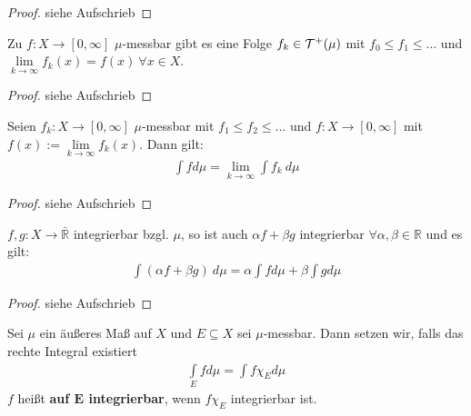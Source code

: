 \documentclass[11pt,a4paper,fleqn,openany]{report}
\begin{document}
    \begin{proof}
      siehe Aufschrieb
    \end{proof}

    \begin{theorem}
      Zu $f: X \to [0,\infty]$ $\mu$-messbar gibt es eine Folge $f_k \in \mathcal{T}^+(\mu)$ mit $f_0 \leq f_1 \leq ...$ und $\lim\limits_{k \to \infty} f_k(x) = f(x) \ \forall x \in X$.
    \end{theorem}

    \begin{proof}
      siehe Aufschrieb
    \end{proof}

    \begin{theorem}
      Seien $f_k:X \to [0,\infty]$ $\mu$-messbar mit $f_1 \leq f_2 \leq ...$ und $f: X \to [0, \infty]$ mit $f(x) := \lim\limits_{k \to \infty} f_k(x)$. Dann gilt:
      \begin{align*}
        \int f d\mu = \lim\limits_{k \to \infty} \int f_k \ d\mu
      \end{align*}
    \end{theorem}

    \begin{proof}
      siehe Aufschrieb
    \end{proof}

    \begin{theorem}
      $f,g: X \to \bar{\mathbb{R}}$ integrierbar bzgl. $\mu$, so ist auch $\alpha f + \beta g$ integrierbar $\forall \alpha, \beta \in \mathbb{R}$ und es gilt:
      \begin{align*}
        \int (\alpha f + \beta g) \ d\mu = \alpha \int f d\mu + \beta \int g d\mu
      \end{align*}
    \end{theorem}

    \begin{proof}
      siehe Aufschrieb
    \end{proof}

    \begin{definition}
      Sei $\mu$ ein äußeres Maß auf $X$ und $E \subseteq X$ sei $\mu$-messbar. Dann setzen wir, falls das rechte Integral existiert
      \begin{align*}
        \int\limits_E f d\mu = \int f \chi_E d\mu
      \end{align*}
      $f$ heißt \textbf{auf $\bm{E}$ integrierbar}, wenn $f \chi_E$ integrierbar ist.
    \end{definition}
\end{document}

